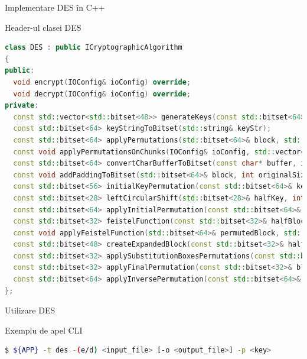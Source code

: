 \documentclass{beamer}
\begin{document}
\begin{frame}[fragile]{Implementare DES în C++}
  \begin{block}{Header-ul clasei DES}
    \begin{lstlisting}[language=C++]
class DES : public ICryptographicAlgorithm
{
public:
  void encrypt(IOConfig& ioConfig) override;
  void decrypt(IOConfig& ioConfig) override;
private:
  const std::vector<std::bitset<48>> generateKeys(const std::bitset<64>& key);
  const std::bitset<64> keyStringToBitset(std::string& keyStr);
  const std::bitset<64> applyPermutations(std::bitset<64>& block, std::vector<std::bitset<48>>& subKeys);
  const void applyPermutationsOnChunks(IOConfig& ioConfig, std::vector<std::bitset<48>>& subKeys);
  const std::bitset<64> convertCharBufferToBitset(const char* buffer, int bufferSize);
  const void addPaddingToBitset(std::bitset<64>& block, int originalSize);
  const std::bitset<56> initialKeyPermutation(const std::bitset<64>& key);
  const std::bitset<28> leftCircularShift(std::bitset<28>& halfKey, int shifts);
  const std::bitset<64> applyInitialPermutation(const std::bitset<64>& block);
  const std::bitset<32> feistelFunction(const std::bitset<32>& halfBlock, const std::bitset<48>& key);
  const void applyFeistelFunction(std::bitset<64>& permutedBlock, std::vector<std::bitset<48>>& subKeys);
  const std::bitset<48> createExpandedBlock(const std::bitset<32>& halfBlock);
  const std::bitset<32> applySubstitutionBoxesPermutations(const std::bitset<48>& xored);
  const std::bitset<32> applyFinalPermutation(const std::bitset<32>& block);
  const std::bitset<64> applyInversePermutation(const std::bitset<64>& permutedBlock);
};
    \end{lstlisting}
  \end{block}
\end{frame}

\begin{frame}[fragile]{Utilizare DES}
  \begin{block}{Exemplu de apel CLI}
    \begin{lstlisting}[language=bash]
$ ${APP} -t des -(e/d) <input_file> [-o <output_file>] -p <key>
    \end{lstlisting}
  \end{block}
\end{frame}
\end{document}
